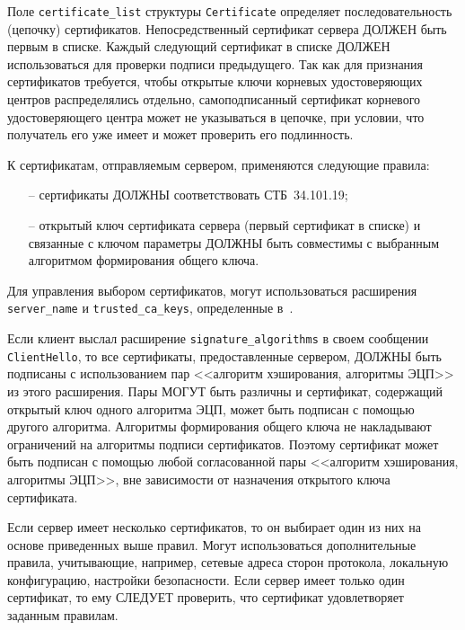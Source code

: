 Поле \lstinline{certificate_list} структуры \lstinline{Certificate}
определяет последовательность (цепочку) сертификатов. Непосредственный
сертификат сервера ДОЛЖЕН быть первым в списке. Каждый следующий сертификат
в списке ДОЛЖЕН использоваться для проверки подписи предыдущего. Так как
для признания сертификатов требуется, чтобы открытые ключи корневых
удостоверяющих центров распределялись отдельно, самоподписанный сертификат
корневого удостоверяющего центра может не указываться в цепочке, при
условии, что получатель его уже имеет и может проверить его подлинность.

К сертификатам, отправляемым сервером, применяются следующие правила:
\begin{itemize}
\item[--]
сертификаты ДОЛЖНЫ соответствовать СТБ~34.101.19;

\item[--]
открытый ключ сертификата сервера (первый сертификат в списке) и 
связанные с ключом параметры ДОЛЖНЫ быть совместимы с выбранным 
алгоритмом формирования общего ключа. 
\end{itemize}

\begin{note*}
Для управления выбором сертификатов, могут использоваться расширения 
\lstinline{server_name} и \lstinline{trusted_ca_keys}, определенные 
в~\cite{RFC6066}.
\end{note*} 

Если клиент выслал расширение \lstinline{signature_algorithms} в своем сообщении 
\lstinline{ClientHello}, то все сертификаты, предоставленные сервером, ДОЛЖНЫ быть 
подписаны с использованием пар <<алгоритм хэширования, алгоритмы ЭЦП>> из 
этого расширения. Пары МОГУТ быть различны и сертификат, содержащий 
открытый ключ одного алгоритма ЭЦП, может быть подписан с помощью другого 
алгоритма. Алгоритмы формирования общего ключа не накладывают ограничений 
на алгоритмы подписи сертификатов. Поэтому сертификат может быть подписан 
с помощью любой согласованной пары <<алгоритм хэширования, алгоритмы ЭЦП>>, 
вне зависимости от назначения открытого ключа сертификата. 

Если сервер имеет несколько сертификатов, то он выбирает один из них на 
основе приведенных выше правил. Могут использоваться дополнительные 
правила, учитывающие, например, сетевые адреса сторон протокола, локальную 
конфигурацию, настройки безопасности. Если сервер имеет только один 
сертификат, то ему СЛЕДУЕТ проверить, что сертификат удовлетворяет 
заданным правилам. 

